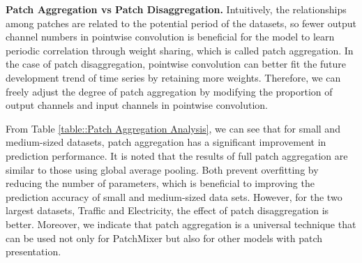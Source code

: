 \documentclass{article} \usepackage{iclr2024_conference,times}
\begin{document}
\textbf{Patch Aggregation vs Patch Disaggregation.} Intuitively, the relationships among patches are related to the potential period of the datasets, so fewer output channel numbers in pointwise convolution is beneficial for the model to learn periodic correlation through weight sharing, which is called patch aggregation. In the case of patch disaggregation, pointwise convolution can better fit the future development trend of time series by retaining more weights. Therefore, we can freely adjust the degree of patch aggregation by modifying the proportion of output channels and input channels in pointwise convolution. 

From Table \ref{table::Patch Aggregation Analysis}, we can see that for small and medium-sized datasets, patch aggregation has a significant improvement in prediction performance. It is noted that the results of full patch aggregation are similar to those using global average pooling. Both prevent overfitting by reducing the number of parameters, which is beneficial to improving the prediction accuracy of small and medium-sized data sets. However, for the two largest datasets, Traffic and Electricity, the effect of patch disaggregation is better. Moreover, we indicate that patch aggregation is a universal technique that can be used not only for PatchMixer but also for other models with patch presentation.
\linespread{1.2}
\end{document}
